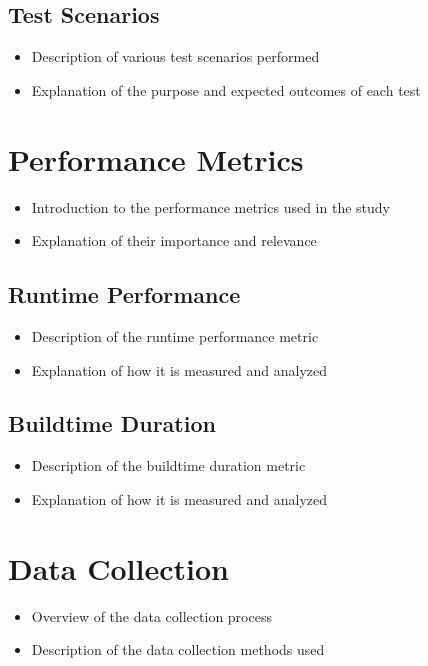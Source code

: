 \subsection{Test Scenarios}

\begin{itemize}
    \item Description of various test scenarios performed
    \item Explanation of the purpose and expected outcomes of each test
\end{itemize}

\section{Performance Metrics}

\begin{itemize}
    \item Introduction to the performance metrics used in the study
    \item Explanation of their importance and relevance
\end{itemize}

\subsection{Runtime Performance}

\begin{itemize}
    \item Description of the runtime performance metric
    \item Explanation of how it is measured and analyzed
\end{itemize}

\subsection{Buildtime Duration}

\begin{itemize}
    \item Description of the buildtime duration metric
    \item Explanation of how it is measured and analyzed
\end{itemize}

\section{Data Collection}

\begin{itemize}
    \item Overview of the data collection process
    \item Description of the data collection methods used
\end{itemize}

